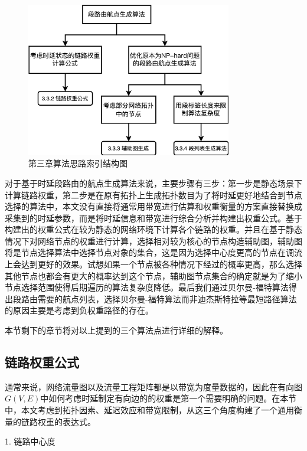 \begin{figure}[htbp]
\setlength{\abovecaptionskip}{15pt plus 3pt minus 2pt}
\centerline{\includegraphics[width=0.8\textwidth]{./figures/ch3-ark.png}}
\caption{第三章算法思路索引结构图}
\label{fig-ch3-ark}
\end{figure}

对于基于时延段路由的航点生成算法来说，主要步骤有三步：第一步是静态场景下计算链路权重，第二步是在原有拓扑上生成拓扑数目为了将时延更好地结合到节点选择的算法中，本文没有直接将通常用带宽进行估算和权重衡量的方案直接替换成采集到的时延参数，而是将时延信息和带宽进行综合分析并构建出权重公式。基于构建出的权重公式在较为静态的网络环境下计算各个链路的权重。并且在基于静态情况下对网络节点的权重进行计算，选择相对较为核心的节点构造辅助图，辅助图将是节点选择算法中选择节点对象的集合，这是因为选择中心度更高的节点在调流上会达到更好的效果。试想如果一个节点被各种情况下经过的概率更高，那么选择其他节点也都会有更大的概率达到这个节点，辅助图节点集合的确定就是为了缩小节点选择范围使得后期遍历的算法复杂度降低。最后我们通过贝尔曼-福特算法得出段路由需要的航点列表，选择贝尔曼-福特算法而非迪杰斯特拉等最短路径算法的原因主要是考虑到负权重路径的存在。

本节剩下的章节将对以上提到的三个算法点进行详细的解释。

\subsection{链路权重公式}

通常来说，网络流量图以及流量工程矩阵都是以带宽为度量数据的，因此在有向图$G(V, E)$中如何考虑时延制定有向边的的权重是第一个需要明确的问题。在本节中，本文考虑到拓扑因素、延迟效应和带宽限制，从这三个角度构建了一个通用衡量的链路权重的表达式。

1. 链路中心度

